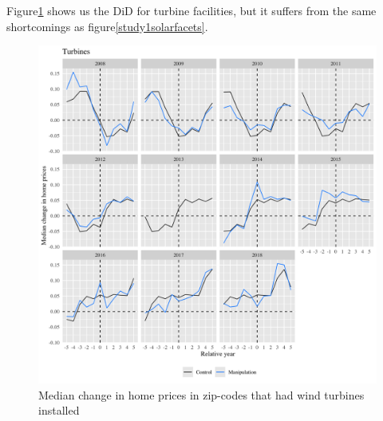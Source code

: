 \documentclass{article}
\begin{document}
Figure\ref{study1turbinefacets} shows us the DiD for turbine facilities, but it suffers from the same shortcomings as figure\ref{study1solarfacets}.
\begin{figure}[h]
\centering
\includegraphics[width=0.9\linewidth]
{study1_turbine_facets.png} 
\caption{Median change in home prices in zip-codes that had wind turbines installed}
\label{study1turbinefacets}
\end{figure}
\end{document}
